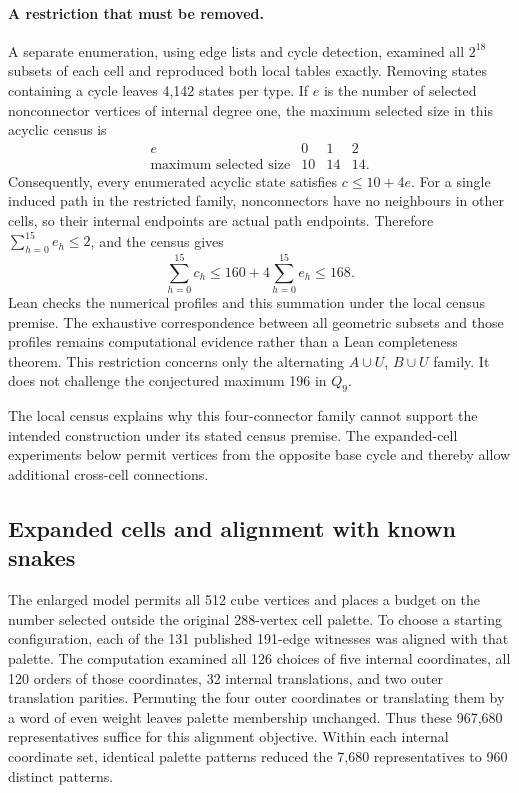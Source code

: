 \documentclass[11pt,a4paper]{article}
\theoremstyle{definition}
\theoremstyle{remark}
\begin{document}
\paragraph{A restriction that must be removed.}
A separate enumeration, using edge lists and cycle detection, examined all $2^{18}$ subsets of each cell and reproduced both local tables exactly. Removing states containing a cycle leaves 4,142 states per type. If $e$ is the number of selected nonconnector vertices of internal degree one, the maximum selected size in this acyclic census is
\[
\begin{array}{c|rrr}
e&0&1&2\\\hline
\text{maximum selected size}&10&14&14.
\end{array}
\]
Consequently, every enumerated acyclic state satisfies $c\le10+4e$. For a single induced path in the restricted family, nonconnectors have no neighbours in other cells, so their internal endpoints are actual path endpoints. Therefore $\sum_{h=0}^{15}e_h\le2$, and the census gives
\[
\sum_{h=0}^{15}c_h\le160+4\sum_{h=0}^{15}e_h\le168.
\]
Lean checks the numerical profiles and this summation under the local census premise. The exhaustive correspondence between all geometric subsets and those profiles remains computational evidence rather than a Lean completeness theorem. This restriction concerns only the alternating $A\cup U$, $B\cup U$ family. It does not challenge the conjectured maximum 196 in $Q_9$.

The local census explains why this four-connector family cannot support the intended construction under its stated census premise. The expanded-cell experiments below permit vertices from the opposite base cycle and thereby allow additional cross-cell connections.

\subsection{Expanded cells and alignment with known snakes}
The enlarged model permits all 512 cube vertices and places a budget on the number selected outside the original 288-vertex cell palette. To choose a starting configuration, each of the 131 published 191-edge witnesses was aligned with that palette. The computation examined all 126 choices of five internal coordinates, all 120 orders of those coordinates, 32 internal translations, and two outer translation parities. Permuting the four outer coordinates or translating them by a word of even weight leaves palette membership unchanged. Thus these 967,680 representatives suffice for this alignment objective. Within each internal coordinate set, identical palette patterns reduced the 7,680 representatives to 960 distinct patterns.
\end{document}
